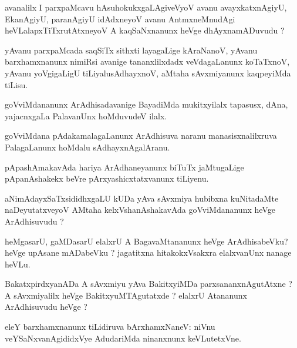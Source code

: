 \documentclass{article}
\begin{document}
\begin{mn}%
avanalilx I parxpaMcavu hAsuhokukxgaLAgiveVyoV avanu avayxkatxnAgiyU, EkanAgiyU, 
paranAgiyU idAdxneyoV avanu AntmxneMnudAgi heVLalapxTiTxrutAtxneyoV A kaqSaNxnanunx heVge 
dhAyxnamADuvudu ?	
\end{mn}

\begin{mn}%
yAvanu parxpaMcada saqSiTx sithxti layagaLige kAraNanoV, yAvanu  barxhamxnanunx nimiRsi 
avanige tananxlilxdadx veVdagaLanunx koTaTxnoV, yAvanu yoVgigaLigU tiLiyalusAdhayxnoV, 
aMtaha sAvxmiyanunx kaqpeyiMda tiLisu.
\end{mn}

\begin{mn}%
goVviMdananunx ArAdhisadavanige BayadiMda mukitxyilalx tapasusx, dAna, yajacnxgaLa 
PalavanUnx hoMduvudeV ilalx.
\end{mn}

\begin{mn}%
goVviMdana pAdakamalagaLanunx ArAdhisuva naranu manasisxnalilxruva PalagaLanunx hoMdalu 
sAdhayxnAgalAranu.
\end{mn}

\begin{mn}%
pApashAmakavAda hariya ArAdhaneyanunx biTuTx jaMtugaLige pApanAshakekx beVre 
pArxyashicxtatxvanunx tiLiyenu.
\end{mn}

\begin{mn}%
aNimAdayxSaTxsididhxgaLU kUDa yAva sAvxmiya hubibxna kuNitadaMte naDeyutatxveyoV AMtaha 
kelxVshanAshakavAda goVviMdananunx heVge ArAdhisuvudu ?
\end{mn}

\begin{mn}%
heMgasarU, gaMDasarU elalxrU A BagavaMtananunx heVge ArAdhisabeVku? heVge upAsane 
mADabeVku ? jagatitxna hitakokxVsakxra elalxvanUnx nanage heVLu.
\end{mn}

\begin{mn}%
BakatxpirdxyanADa A sAvxmiyu yAva BakitxyiMDa parxsananxnAgutAtxne ? A sAvxmiyalilx heVge 
BakitxyuMTAgutatxde ? elalxrU Atananunx ArAdhisuvudu heVge ?
\end{mn}

\begin{mn}%
eleY barxhamxnanunx tiLidiruva bArxhamxNaneV: niVnu veYSaNxvanAgididxVye AdudariMda 
ninanxnunx keVLutetxVne.
\end{mn}
\end{document}
